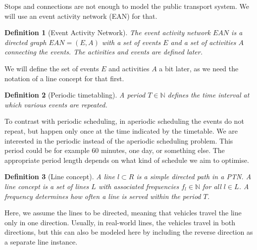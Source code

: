 \documentclass[english, 12pt, a4paper, sci, utf8, a-2b, online]{aaltothesis}
\newtheorem{definition}{Definition}
\newcommand{\N}{\mathbb{N}}
\newcommand{\period}{T}
\begin{document}
Stops and connections are not enough to model the public transport system. We will use an event activity network (EAN) for that.
\begin{definition}[Event Activity Network]\label{def:ean}
    The event activity network $EAN$ is a directed graph $\textit{EAN} = (E, A)$ with a set of events $E$ and a set of activities $A$ connecting the events. The activities and events are defined later.
\end{definition}
We will define the set of events $E$ and activities $A$ a bit later, as we need the notation of a line concept for that first.

\begin{definition}[Periodic timetabling] 
    A period $\period \in \N$ defines the time interval at which various events are repeated.
\end{definition}

To contrast with periodic scheduling, in aperiodic scheduling the events do not repeat, but happen only once at the time indicated by the timetable. We are interested in the periodic instead of the aperiodic scheduling problem. This period could be for example 60 minutes, one day, or something else. The appropriate period length depends on what kind of schedule we aim to optimise. %

\begin{definition}[Line concept]
    A \textit{line} $l \subset R$ is a simple directed path in a PTN. A \textit{line concept} is a set of lines $L$ with associated frequencies $f_l \in \N$ for all $l \in L$. A frequency determines how often a line is served within the period $T$.
\end{definition}


Here, we assume the lines to be directed, meaning that vehicles travel the line only in one direction. Usually, in real-world lines, the vehicles travel in both directions, but this can also be modeled here by including the reverse direction as a separate line instance. %
\end{document}
